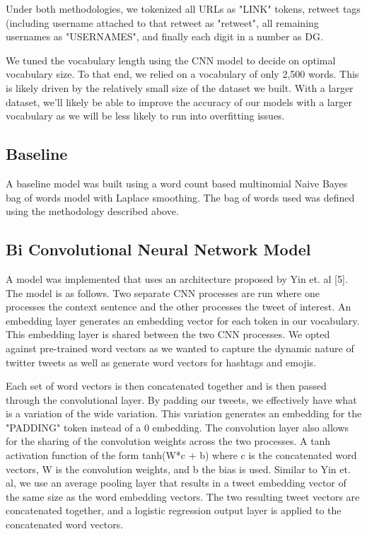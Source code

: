 \documentclass[11pt,a4paper]{article}
\begin{document}
Under both methodologies, we tokenized all URLs as "LINK" tokens, retweet tags (including username attached to that retweet as "retweet", all remaining usernames as "USERNAMES", and finally each digit in a number as DG. 

We tuned the vocabulary length using the CNN model to decide on optimal vocabulary size. To that end, we relied on a vocabulary of only 2,500 words. This is likely driven by the relatively small size of the dataset we built. With a larger dataset, we'll likely be able to improve the accuracy of our models with a larger vocabulary as we will be less likely to run into overfitting issues.

\subsection{Baseline}
A baseline model was built using a word count based multinomial Naive Bayes bag of words model with Laplace smoothing. The bag of words used was defined using the methodology described above. 

\subsection{Bi Convolutional Neural Network Model}

A model was implemented that uses an architecture proposed by Yin et. al [5]. The model is as follows. Two separate CNN processes are run where one processes the context sentence and the other processes the tweet of interest. An embedding layer generates an embedding vector for each token in our vocabulary. This embedding layer is shared between the two CNN processes. We opted against pre-trained word vectors as we wanted to capture the dynamic nature of twitter tweets as well as generate word vectors for hashtags and emojis. 

Each set of word vectors is then concatenated together and is then passed through the convolutional layer. By padding our tweets, we effectively have what is a variation of the wide variation. This variation generates an embedding for the "PADDING" token instead of a 0 embedding. The convolution layer also allows for the sharing of the convolution weights across the two processes. A tanh activation function of the form tanh(W*c + b)  where c is the concatenated word vectors, W is the convolution weights, and b the bias is used. Similar to Yin et. al, we use an average pooling layer that results in a tweet embedding vector of the same size as the word embedding vectors. The two resulting tweet vectors are concatenated together, and a logistic regression output layer is applied to the concatenated word vectors.
\end{document}
